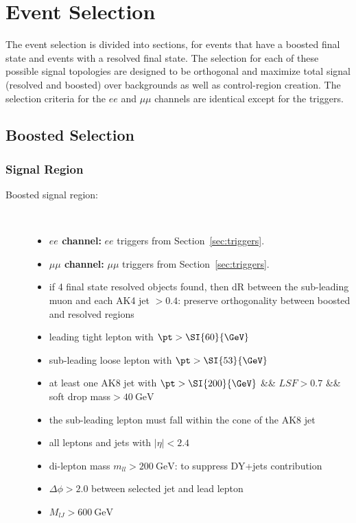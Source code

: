 \chapter{Event Selection}
The event selection is divided into sections, for events that have a boosted final state and events with a resolved final state.
The selection for each of these possible signal topologies are designed to be orthogonal and maximize total signal (resolved and boosted) over backgrounds as well as control-region creation. The selection criteria for the $ee$ and $\mu\mu$ channels are identical except for the triggers.


\section{Boosted Selection}

\subsection{Signal Region}

\begin{description}
\item[Boosted signal region:] \
  \begin{itemize}
  \item \textbf{$ee$ channel:} $ee$ triggers from Section~\ref{sec:triggers}.
  \item \textbf{$\mu\mu$ channel:} $\mu\mu$ triggers from Section~\ref{sec:triggers}.
  \item if 4 final state resolved objects found, then dR between the sub-leading muon and each AK4 jet $>0.4$: preserve orthogonality between boosted and resolved regions
  \item leading tight lepton with $\pt > \SI{60}{\GeV}$
  \item sub-leading loose lepton with $\pt >\SI{53}{\GeV}$
  \item at least one AK8 jet with  $\pt >\SI{200}{\GeV}$ \&\& $LSF > 0.7$ \&\& soft drop mass$ > \SI{40}{\GeV}$
  \item the sub-leading lepton must fall within the cone of the AK8 jet
  \item all leptons and jets with $|\eta| < 2.4$
  \item di-lepton mass $m_{ll} > \SI{200}{\GeV}$: to suppress DY+jets contribution
  \item $\Delta \phi > 2.0$ between selected jet and lead lepton
  \item $M_{l J} > \SI{600}{\GeV}$
  \end{itemize}
\end{description}

